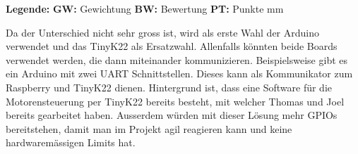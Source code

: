 \documentclass[../main.tex]{subfiles}
\begin{document}
    \begin{table}[H]
        \textbf{Legende:}
        \hspace{1cm}
        \textbf{GW:} Gewichtung
        \hspace{1cm}
        \textbf{BW:} Bewertung
        \hspace{1cm}
        \textbf{PT:} Punkte
         mm
            \caption{Nutzwertanalyse der Mikrocontroller}
            \label{tab:konzept_nutzwertanalyse_mikrocontroller}
        \end{table}

    Da der Unterschied nicht sehr gross ist, wird als erste Wahl der Arduino verwendet und das TinyK22 als Ersatzwahl. Allenfalls könnten beide Boards verwendet werden, die dann miteinander kommunizieren. Beispielsweise gibt es ein Arduino mit zwei UART Schnittstellen. Dieses kann als Kommunikator zum Raspberry und TinyK22 dienen. Hintergrund ist, dass eine Software für die Motorensteuerung per TinyK22 bereits besteht, mit welcher Thomas und Joel bereits gearbeitet haben. Ausserdem würden mit dieser Lösung mehr GPIOs bereitstehen, damit man im Projekt agil reagieren kann und keine hardwaremässigen Limits hat.
\end{document}

